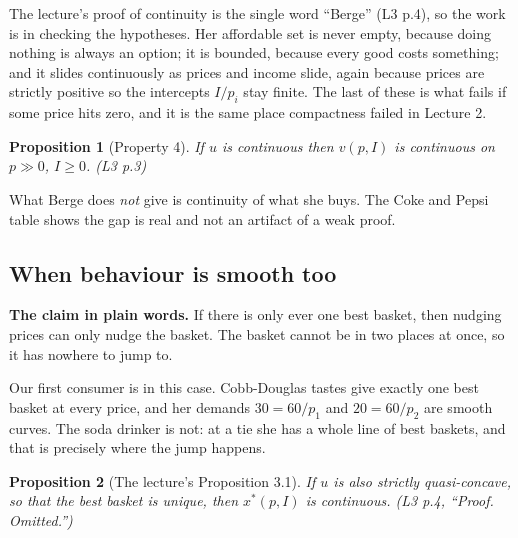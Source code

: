 \documentclass[11pt,letterpaper]{article}
\theoremstyle{definition}
\theoremstyle{plain}
\newtheorem{prop}{Proposition}
\newcommand{\src}[1]{{\small\textsf{(#1)}}}
\begin{document}
The lecture's proof of continuity is the single word ``Berge'' \src{L3 p.4}, so the work is in
checking the hypotheses. Her affordable set is never empty, because doing nothing is always an
option; it is bounded, because every good costs something; and it slides continuously as prices and
income slide, again because prices are strictly positive so the intercepts $I/p_i$ stay finite. The
last of these is what fails if some price hits zero, and it is the same place compactness failed in
Lecture 2.

\begin{prop}[Property 4] If $u$ is continuous then $v(p,I)$ is continuous on $p \gg 0$, $I \ge 0$.
\src{L3 p.3}
\end{prop}

What Berge does \emph{not} give is continuity of what she buys. The Coke and Pepsi table shows the
gap is real and not an artifact of a weak proof.

\subsection{When behaviour is smooth too}

\textbf{The claim in plain words.} If there is only ever one best basket, then nudging prices can
only nudge the basket. The basket cannot be in two places at once, so it has nowhere to jump to.

Our first consumer is in this case. Cobb-Douglas tastes give exactly one best basket at every price,
and her demands $30 = 60/p_1$ and $20 = 60/p_2$ are smooth curves. The soda drinker is not: at a tie
she has a whole line of best baskets, and that is precisely where the jump happens.

\begin{prop}[The lecture's Proposition 3.1] \label{prop:xcont}
If $u$ is also strictly quasi-concave, so that the best basket is unique, then $x^*(p,I)$ is
continuous. \src{L3 p.4, ``Proof. Omitted.''}
\end{prop}
\end{document}
